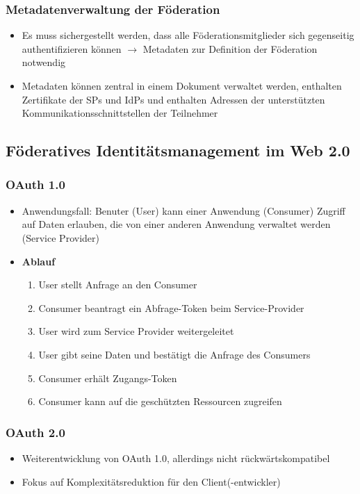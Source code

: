 \subsubsection{Metadatenverwaltung der Föderation}
\begin{itemize}
	\item Es muss sichergestellt werden, dass alle Föderationsmitglieder sich gegenseitig authentifizieren können $\rightarrow$ Metadaten zur Definition der Föderation notwendig
	\item Metadaten können zentral in einem Dokument verwaltet werden, enthalten Zertifikate der SPs und IdPs und enthalten Adressen der unterstützten Kommunikationsschnittstellen der Teilnehmer
\end{itemize}


\subsection{Föderatives Identitätsmanagement im Web 2.0}

\subsubsection{OAuth 1.0}
\begin{itemize}
	\item Anwendungsfall: Benuter (User) kann einer Anwendung (Consumer) Zugriff auf Daten erlauben, die von einer anderen Anwendung verwaltet werden (Service Provider)
	\item \textbf{Ablauf}
	\begin{enumerate}
		\item User stellt Anfrage an den Consumer
		\item Consumer beantragt ein Abfrage-Token beim Service-Provider
		\item User wird zum Service Provider weitergeleitet
		\item User gibt seine Daten und bestätigt die Anfrage des Consumers
		\item Consumer erhält Zugangs-Token
		\item Consumer kann auf die geschützten Ressourcen zugreifen
	\end{enumerate}
\end{itemize}

\subsubsection{OAuth 2.0}
\begin{itemize}
	\item Weiterentwicklung von OAuth 1.0, allerdings nicht rückwärtskompatibel
	\item Fokus auf Komplexitätsreduktion für den Client(-entwickler)
\end{itemize}


